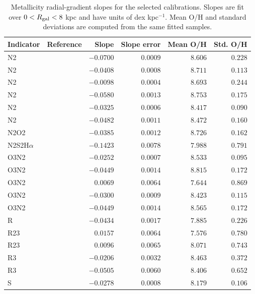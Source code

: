 \begin{table}
\centering
\caption{Metallicity radial-gradient slopes for the selected calibrations. Slopes are fit over $0<R_{\rm gal}<8$ kpc and have units of dex kpc$^{-1}$. Mean O/H and standard deviations are computed from the same fitted samples.}
\label{tab:metallicity_gradient_slopes}
\begin{tabular}{llrrrr}
\hline
Indicator & Reference & Slope & Slope error & Mean O/H & Std. O/H \\
\hline
N2 & \citet{Brazzini_2024} & $-0.0700$ & $0.0009$ & $8.606$ & $0.228$ \\
N2 & \citet{Brown_2016} & $-0.0408$ & $0.0008$ & $8.711$ & $0.113$ \\
N2 & \citet{Curti_2017} & $-0.0098$ & $0.0004$ & $8.693$ & $0.244$ \\
N2 & \citet{Maiolino_2008} & $-0.0580$ & $0.0013$ & $8.753$ & $0.175$ \\
N2 & \citet{Marino_2013} & $-0.0325$ & $0.0006$ & $8.417$ & $0.090$ \\
N2 & \citet{Pettini_2004} & $-0.0482$ & $0.0011$ & $8.472$ & $0.160$ \\
\hline
N2O2 & \citet{Brown_2016} & $-0.0385$ & $0.0012$ & $8.726$ & $0.162$ \\
\hline
N2S2H$\alpha$ & \citet{Brazzini_2024} & $-0.1423$ & $0.0078$ & $7.988$ & $0.791$ \\
\hline
O3N2 & \citet{Brazzini_2024} & $-0.0252$ & $0.0007$ & $8.533$ & $0.095$ \\
O3N2 & \citet{Brown_2016} & $-0.0449$ & $0.0014$ & $8.815$ & $0.172$ \\
O3N2 & \citet{Curti_2017} & $0.0069$ & $0.0064$ & $7.644$ & $0.869$ \\
O3N2 & \citet{Marino_2013} & $-0.0300$ & $0.0009$ & $8.423$ & $0.115$ \\
O3N2 & \citet{Pettini_2004} & $-0.0449$ & $0.0014$ & $8.565$ & $0.172$ \\
\hline
R & \citet{Pilyugin_2016} & $-0.0434$ & $0.0017$ & $7.885$ & $0.226$ \\
\hline
R23 & \citet{Curti_2017} & $0.0157$ & $0.0064$ & $7.576$ & $0.780$ \\
R23 & \citet{Maiolino_2008} & $0.0096$ & $0.0065$ & $8.071$ & $0.743$ \\
\hline
R3 & \citet{Brazzini_2024} & $-0.0206$ & $0.0032$ & $8.463$ & $0.372$ \\
R3 & \citet{Curti_2017} & $-0.0505$ & $0.0060$ & $8.406$ & $0.652$ \\
\hline
S & \citet{Pilyugin_2016} & $-0.0278$ & $0.0008$ & $8.179$ & $0.106$ \\
\hline
\end{tabular}
\end{table}
